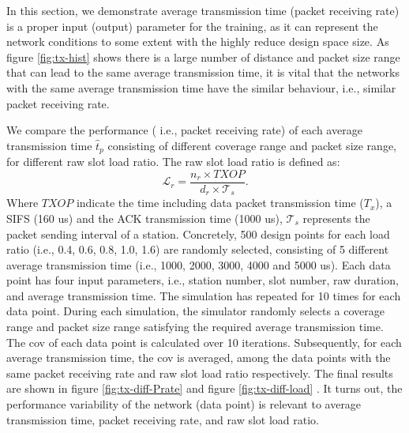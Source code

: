 In this section, we demonstrate average transmission time (packet receiving rate) is a proper input (output) parameter for the training, as it can represent the network conditions to some extent with the highly reduce design space size. As figure \ref{fig:tx-hist} shows there is a large number of distance and packet size range that can lead to the same average transmission time, it is vital that the networks with the same average transmission time have the similar behaviour, i.e., similar packet receiving rate. %

We compare the performance ( i.e., packet receiving rate) of each average transmission time $\hat{t}_p$ consisting of different coverage range and packet size range, for different \gls{raw} slot load ratio. The \gls{raw} slot load ratio is defined as:
 \\
\begin{equation}
\mathcal{L}_{r} = \frac {n_r \times TXOP} {d_r \times \mathcal{T}_s}.
\end{equation}
Where $TXOP$ indicate the time including data packet transmission time ($T_x$), a SIFS (160 us) and the ACK transmission time (1000 us), $\mathcal{T}_s$ represents the packet sending interval of a station. 
Concretely, 500 design points for each load ratio (i.e., 0.4, 0.6, 0.8, 1.0, 1.6) are randomly selected, consisting of 5 different average transmission time (i.e., 1000,
2000, 3000, 4000 and 5000 us). Each data point has four input parameters, i.e., station number, slot number, \gls{raw} duration, and average transmission time. The simulation has repeated for 10 times for each data point. During each simulation, the simulator randomly selects a coverage range and packet size range satisfying the required average transmission time. The \gls{cov} of each data point is calculated over 10 iterations. Subsequently, for each average transmission time, the \gls{cov} is averaged, among the data points with the same packet receiving rate and \gls{raw} slot load ratio respectively. The final results are shown in figure \ref{fig:tx-diff-Prate} and figure \ref{fig:tx-diff-load} . It turns out, the performance variability of the network (data point) is relevant to  average transmission time, packet receiving rate, and \gls{raw} slot load ratio.



